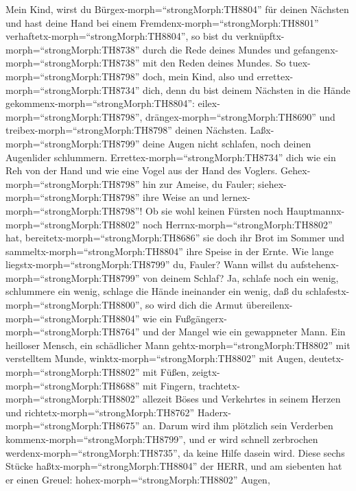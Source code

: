  Mein Kind, wirst du Bürgex-morph=``strongMorph:TH8804'' für
deinen Nächsten und hast deine Hand bei einem
Fremdenx-morph=``strongMorph:TH8801''
verhaftetx-morph=``strongMorph:TH8804'',  so bist du
verknüpftx-morph=``strongMorph:TH8738'' durch die Rede deines Mundes und
gefangenx-morph=``strongMorph:TH8738'' mit den Reden deines Mundes.
 So tuex-morph=``strongMorph:TH8798'' doch, mein Kind, also
und errettex-morph=``strongMorph:TH8734'' dich, denn du bist deinem
Nächsten in die Hände gekommenx-morph=``strongMorph:TH8804'':
eilex-morph=``strongMorph:TH8798'', drängex-morph=``strongMorph:TH8690''
und treibex-morph=``strongMorph:TH8798'' deinen Nächsten. 
Laßx-morph=``strongMorph:TH8799'' deine Augen nicht schlafen, noch
deinen Augenlider schlummern. 
Errettex-morph=``strongMorph:TH8734'' dich wie ein Reh von der Hand und
wie eine Vogel aus der Hand des Voglers. 
Gehex-morph=``strongMorph:TH8798'' hin zur Ameise, du Fauler;
siehex-morph=``strongMorph:TH8798'' ihre Weise an und
lernex-morph=``strongMorph:TH8798''!  Ob sie wohl keinen
Fürsten noch Hauptmannx-morph=``strongMorph:TH8802'' noch
Herrnx-morph=``strongMorph:TH8802'' hat, 
bereitetx-morph=``strongMorph:TH8686'' sie doch ihr Brot im Sommer und
sammeltx-morph=``strongMorph:TH8804'' ihre Speise in der Ernte.
 Wie lange liegstx-morph=``strongMorph:TH8799'' du, Fauler?
Wann willst du aufstehenx-morph=``strongMorph:TH8799'' von deinem
Schlaf?  Ja, schlafe noch ein wenig, schlummere ein wenig,
schlage die Hände ineinander ein wenig, daß du
schlafestx-morph=``strongMorph:TH8800'',  so wird dich die
Armut übereilenx-morph=``strongMorph:TH8804'' wie ein
Fußgängerx-morph=``strongMorph:TH8764'' und der Mangel wie ein
gewappneter Mann.  Ein heilloser Mensch, ein schädlicher
Mann gehtx-morph=``strongMorph:TH8802'' mit verstelltem Munde,
 winktx-morph=``strongMorph:TH8802'' mit Augen,
deutetx-morph=``strongMorph:TH8802'' mit Füßen,
zeigtx-morph=``strongMorph:TH8688'' mit Fingern, 
trachtetx-morph=``strongMorph:TH8802'' allezeit Böses und Verkehrtes in
seinem Herzen und richtetx-morph=``strongMorph:TH8762''
Haderx-morph=``strongMorph:TH8675'' an.  Darum wird ihm
plötzlich sein Verderben kommenx-morph=``strongMorph:TH8799'', und er
wird schnell zerbrochen werdenx-morph=``strongMorph:TH8735'', da keine
Hilfe dasein wird.  Diese sechs Stücke
haßtx-morph=``strongMorph:TH8804'' der HERR, und am siebenten hat er
einen Greuel:  hohex-morph=``strongMorph:TH8802'' Augen,
